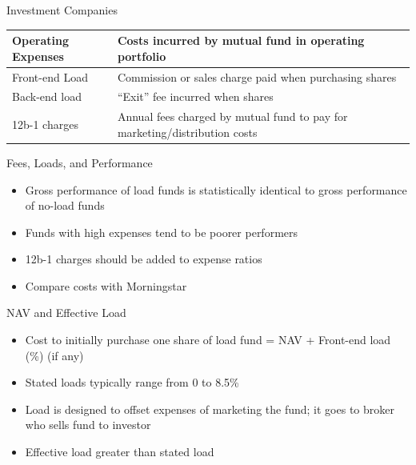 \documentclass{beamer}
\begin{document}
\begin{frame}{Investment Companies}
\begin{center}
\footnotesize
\begin{tabular}{l|p{2in}}
Operating Expenses & Costs incurred by mutual fund in operating portfolio\\ \hline
Front-end Load & Commission or sales charge paid when purchasing shares\\ \hline
Back-end load & ``Exit'' fee incurred when shares\\ \hline
12b-1 charges & Annual fees charged by mutual fund to pay for marketing/distribution costs
\end{tabular}
\end{center}
\end{frame}

\begin{frame}{Fees, Loads, and Performance}
\begin{itemize}
\item Gross performance of load funds is statistically identical to gross performance of no-load funds
\item Funds with high expenses tend to be poorer performers
\item 12b-1 charges should be added to expense ratios
\item Compare costs with Morningstar
\end{itemize}
\end{frame}

\begin{frame}{NAV and Effective Load}
\begin{itemize}
\item Cost to initially purchase one share of load fund = NAV + Front-end load (\%) (if any)
\item Stated loads typically range from 0 to 8.5\%
\item Load is designed to offset expenses of marketing the fund; it goes to broker who sells fund to investor
\item Effective load greater than stated load
\end{itemize}
\end{frame}
\end{document}
